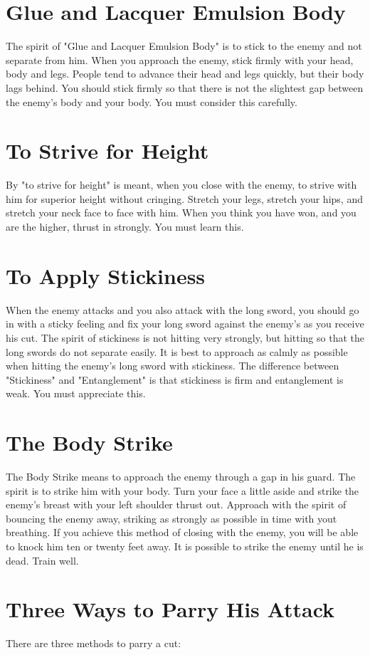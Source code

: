 \documentclass[12pt]{report}
\begin{document}
\section*{Glue and Lacquer Emulsion Body}
The spirit of "Glue and Lacquer Emulsion Body" is to stick to the enemy and not separate from him. When you approach the enemy, stick firmly with your head, body and legs. People tend to advance their head and legs quickly, but their body lags behind. You should stick firmly so that there is not the slightest gap between the enemy's body and your body. You must consider this carefully.
\section*{To Strive for Height}
By "to strive for height" is meant, when you close with the enemy, to strive with him for superior height without cringing. Stretch your legs, stretch your hips, and stretch your neck face to face with him. When you think you have won, and you are the higher, thrust in strongly. You must learn this.
\section*{To Apply Stickiness}
When the enemy attacks and you also attack with the long sword, you should go in with a sticky feeling and fix your long sword against the enemy's as you receive his cut. The spirit of stickiness is not hitting very strongly, but hitting so that the long swords do not separate easily. It is best to approach as calmly as possible when hitting the enemy's long sword with stickiness. The difference between "Stickiness" and "Entanglement" is that stickiness is firm and entanglement is weak. You must appreciate this.
\section*{The Body Strike}
The Body Strike means to approach the enemy through a gap in his guard. The spirit is to strike him with your body. Turn your face a little aside and strike the enemy's breast with your left shoulder thrust out. Approach with the spirit of bouncing the enemy away, striking as strongly as possible in time with yout breathing. If you achieve this method of closing with the enemy, you will be able to knock him ten or twenty feet away. It is possible to strike the enemy until he is dead. Train well.
\section*{Three Ways to Parry His Attack}
There are three methods to parry a cut:
\end{document}
